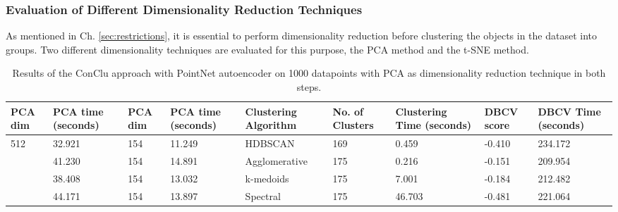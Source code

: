 \subsubsection{Evaluation of Different Dimensionality Reduction Techniques}
\label{sec:conclu_dim}
As mentioned in Ch. \ref{sec:restrictions}, it is essential to perform dimensionality reduction before clustering the objects in the dataset into groups. Two different dimensionality techniques are evaluated for this purpose, the \ac{PCA} method and the \ac{t-SNE} method. 
\begin{table}[H]
  \setlength\extrarowheight{10pt}
  \caption{Results of the ConClu approach with PointNet autoencoder on 1000 datapoints with \ac{PCA} as dimensionality reduction technique in both steps. }
  \centering
  \begin{tabular}{|p{30pt}|p{30pt}|p{30pt}|p{30pt}|p{60pt}|p{30pt}|p{40pt}|p{30pt}|p{30pt}|}
    \toprule
    \ac{PCA} dim & \ac{PCA} time (seconds) & \ac{PCA} dim	& \ac{PCA} time (seconds) & Clustering Algorithm & No. of Clusters & Clustering Time (seconds) & \ac{DBCV} score & \ac{DBCV} Time (seconds)\\
    \midrule
    \multirow{4}{30pt}{512}	& 32.921 & 154	& 11.249 & \ac{HDBSCAN}	& 169	& 0.459 & -0.410	& 234.172 \\ \cline{2-9} 
                              & 41.230 & 154	& 14.891 & Agglomerative	& 175	& 0.216 & -0.151	& 209.954 \\ \cline{2-9} 
                              & 38.408 & 154	& 13.032 & k-medoids	& 175	& 7.001 & -0.184	& 212.482 \\ \cline{2-9}
                              & 44.171 & 154	& 13.897 & Spectral	& 175	& 46.703 &-0.481 & 221.064 \\ 
    \bottomrule
  \end{tabular}
  \label{tab:conclu_pca_1000}
\end{table}
